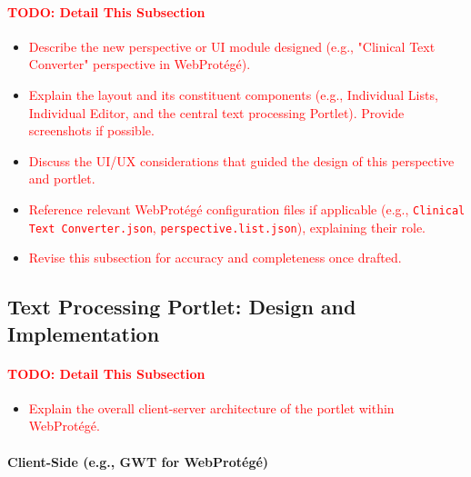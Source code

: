     \paragraph{\textcolor{red}{TODO: Detail This Subsection}}
    \begin{itemize}
        \item[\textcolor{red}{$\bullet$}] \textcolor{red}{Describe the new perspective or UI module designed (e.g., "Clinical Text Converter" perspective in WebProtégé).}
        \item[\textcolor{red}{$\bullet$}] \textcolor{red}{Explain the layout and its constituent components (e.g., Individual Lists, Individual Editor, and the central text processing Portlet). Provide screenshots if possible.}
        \item[\textcolor{red}{$\bullet$}] \textcolor{red}{Discuss the UI/UX considerations that guided the design of this perspective and portlet.}
        \item[\textcolor{red}{$\bullet$}] \textcolor{red}{Reference relevant WebProtégé configuration files if applicable (e.g., \texttt{Clinical Text Converter.json}, \texttt{perspective.list.json}), explaining their role.}
        \item[\textcolor{red}{$\bullet$}] \textcolor{red}{Revise this subsection for accuracy and completeness once drafted.}
    \end{itemize}

    \subsection{Text Processing Portlet: Design and Implementation}
    \paragraph{\textcolor{red}{TODO: Detail This Subsection}}
    \begin{itemize}
        \item[\textcolor{red}{$\bullet$}] \textcolor{red}{Explain the overall client-server architecture of the portlet within WebProtégé.}
    \end{itemize}

        \paragraph{Client-Side (e.g., GWT for WebProtégé)}

